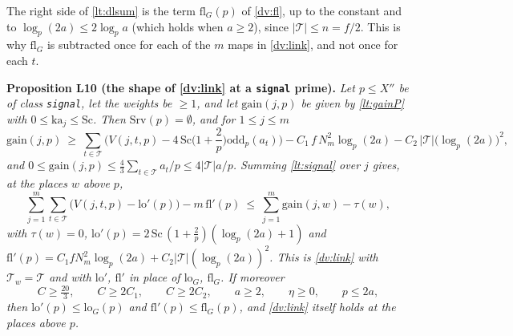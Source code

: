 \documentclass[11pt,letterpaper]{article}
\begin{document}
\noindent The right side of \eqref{lt:dlsum} is the term $\mathrm{fl}_G(p)$ of \eqref{dv:fl}, up to the
constant and to $\log_p(2a)\le2\log_pa$ (which holds when $a\ge2$), since $|\mathcal T|\le n=f/2$. This is
why $\mathrm{fl}_G$ is subtracted once for each of the $m$ maps in \eqref{dv:link}, and not once for each
$t$.

\textbf{Proposition L10 (the shape of \eqref{dv:link} at a \texttt{signal} prime).} \emph{Let $p\le X''$
be of class \texttt{signal}, let the weights be $\ge1$, and let $\mathrm{gain}(j,p)$ be given by
\eqref{lt:gainP} with $0\le\mathrm{ka}_j\le\mathrm{Sc}$. Then $\mathrm{Srv}(p)=\emptyset$, and for
$1\le j\le m$}
\begin{equation}\label{lt:signal}
 \mathrm{gain}(j,p)\ \ge\ \sum_{t\in\mathcal T}\Big(V(j,t,p)-4\,\mathrm{Sc}\Big(1+\frac2p\Big)\mathrm{odd}_p(a_t)\Big)
   -C_1\,f\,N_m^2\log_p(2a)-C_2\,|\mathcal T|\big(\log_p(2a)\big)^2 ,
\end{equation}
\emph{and $0\le\mathrm{gain}(j,p)\le\frac43\sum_{t\in\mathcal T}a_t/p\le4|\mathcal T|a/p$. Summing
\eqref{lt:signal} over $j$ gives, at the places $w$ above $p$,}
\begin{equation}\label{lt:signalsum}
 \sum_{j=1}^m\sum_{t\in\mathcal T}\Big(V(j,t,p)-\mathrm{lo}'(p)\Big)-m\,\mathrm{fl}'(p)\ \le\
 \sum_{j=1}^m\mathrm{gain}(j,w)-\tau(w),
\end{equation}
\emph{with $\tau(w)=0$,
$\mathrm{lo}'(p)=2\,\mathrm{Sc}\,(1+\frac2p)(\log_p(2a)+1)$ and
$\mathrm{fl}'(p)=C_1fN_m^2\log_p(2a)+C_2|\mathcal T|(\log_p(2a))^2$. This is \eqref{dv:link} with
$\mathcal T_w=\mathcal T$ and with $\mathrm{lo}'$, $\mathrm{fl}'$ in place of $\mathrm{lo}_G$,
$\mathrm{fl}_G$. If moreover}
\begin{equation}\label{lt:consts}
 C\ge\tfrac{20}3,\qquad C\ge2C_1,\qquad C\ge2C_2,\qquad a\ge2,\qquad \eta\ge0,\qquad p\le2a,
\end{equation}
\emph{then $\mathrm{lo}'(p)\le\mathrm{lo}_G(p)$ and $\mathrm{fl}'(p)\le\mathrm{fl}_G(p)$, and
\eqref{dv:link} itself holds at the places above $p$.}
\end{document}
